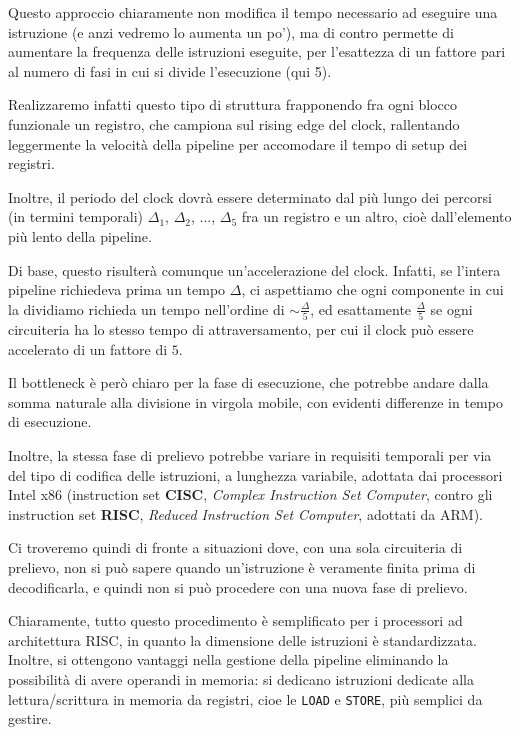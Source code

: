 \documentclass[a4paper,11pt]{article}
\begin{document}
Questo approccio chiaramente non modifica il tempo necessario ad eseguire una istruzione (e anzi vedremo lo aumenta un po'), ma di contro permette di aumentare la frequenza delle istruzioni eseguite, per l'esattezza di un fattore pari al numero di fasi in cui si divide l'esecuzione (qui 5).

Realizzaremo infatti questo tipo di struttura frapponendo fra ogni blocco funzionale un registro, che campiona sul rising edge del clock, rallentando leggermente la velocità della pipeline per accomodare il tempo di setup dei registri.

Inoltre, il periodo del clock dovrà essere determinato dal più lungo dei percorsi (in termini temporali) $\Delta_1$, $\Delta_2$, ..., $\Delta_5$ fra un registro e un altro, cioè dall'elemento più lento della pipeline.

Di base, questo risulterà comunque un'accelerazione del clock.
Infatti, se l'intera pipeline richiedeva prima un tempo $\Delta$, ci aspettiamo che ogni componente in cui la dividiamo richieda un tempo nell'ordine di $\sim \frac{\Delta}{5}$, ed esattamente $\frac{\Delta}{5}$ se ogni circuiteria ha lo stesso tempo di attraversamento, per cui il clock può essere accelerato di un fattore di $5$.

Il bottleneck è però chiaro per la fase di esecuzione, che potrebbe andare dalla somma naturale alla divisione in virgola mobile, con evidenti differenze in tempo di esecuzione.

Inoltre, la stessa fase di prelievo potrebbe variare in requisiti temporali per via del tipo di codifica delle istruzioni, a lunghezza variabile, adottata dai processori Intel x86 (instruction set \textbf{CISC}, \textit{Complex Instruction Set Computer}, contro gli instruction set \textbf{RISC}, \textit{Reduced Instruction Set Computer}, adottati da ARM).

Ci troveremo quindi di fronte a situazioni dove, con una sola circuiteria di prelievo, non si può sapere quando un'istruzione è veramente finita prima di decodificarla, e quindi non si può procedere con una nuova fase di prelievo.

Chiaramente, tutto questo procedimento è semplificato per i processori ad architettura RISC, in quanto la dimensione delle istruzioni è standardizzata.
Inoltre, si ottengono vantaggi nella gestione della pipeline eliminando la possibilità di avere operandi in memoria: si dedicano istruzioni dedicate alla lettura/scrittura in memoria da registri, cioe le \lstinline|LOAD| e \lstinline|STORE|, più semplici da gestire. 
\end{document}
